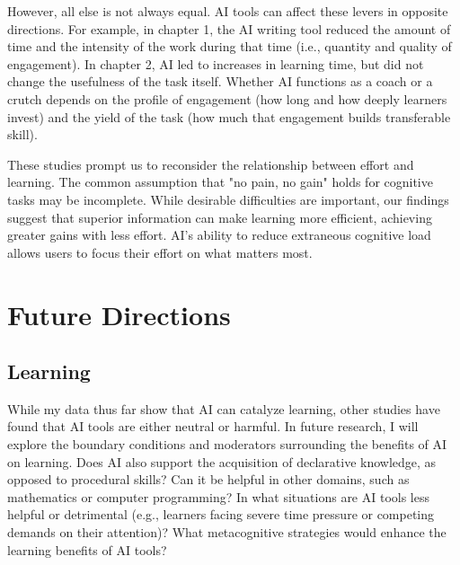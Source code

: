 \documentclass[11pt]{report}
\begin{document}
\begin{mainf}
However, all else is not always equal. AI tools can affect these levers in opposite directions. For example, in chapter 1, the AI writing tool reduced the amount of time and the intensity of the work during that time (i.e., quantity and quality of engagement). In chapter 2, AI led to increases in learning time, but did not change the usefulness of the task itself. Whether AI functions as a coach or a crutch depends on the profile of engagement (how long and how deeply learners invest) and the yield of the task (how much that engagement builds transferable skill).

These studies prompt us to reconsider the relationship between effort and learning. The common assumption that "no pain, no gain" holds for cognitive tasks may be incomplete. While desirable difficulties are important, our findings suggest that superior information can make learning more efficient, achieving greater gains with less effort. AI's ability to reduce extraneous cognitive load allows users to focus their effort on what matters most.


\section{Future Directions}


\subsection*{Learning} While my data thus far show that AI can catalyze learning, other studies have found that AI tools are either neutral or harmful.\cite{bastani2024,lehmann2024ai} In future research, I will explore the boundary conditions and moderators surrounding the benefits of AI on learning. Does AI also support the acquisition of declarative knowledge, as opposed to procedural skills? Can it be helpful in other domains, such as mathematics or computer programming? In what situations are AI tools less helpful or detrimental (e.g., learners facing severe time pressure or competing demands on their attention)? What metacognitive strategies would enhance the learning benefits of AI tools?



\end{mainf}
\end{document}
